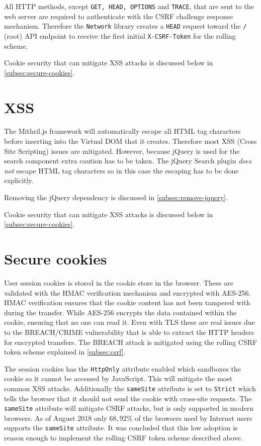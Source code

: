 \documentclass[12pt,a4paper]{report}
\begin{document}
All HTTP methods, except \texttt{GET, HEAD, OPTIONS} and \texttt{TRACE}, that are sent to the web server are required to authenticate with the CSRF challenge response mechanism. Therefore the \texttt{Network} library creates a \texttt{HEAD} request toward the \texttt{/} (root) API endpoint to receive the first initial \texttt{X-CSRF-Token} for the rolling scheme.

Cookie security that can mitigate XSS attacks is discussed below in \autoref{subsec:secure-cookies}.

\section{XSS}
The Mithril.js framework will automatically escape all HTML tag characters before inserting into the Virtual DOM that it creates\cite{mithril-trust}. Therefore most XSS (Cross Site Scripting) issues are mitigated. However, because jQuery is used for the search component extra caution has to be taken. The jQuery Search plugin \textit{does not} escape HTML tag characters so in this case the escaping has to be done explicitly.

Removing the jQuery dependency is discussed in \autoref{subsec:remove-jquery}.

Cookie security that can mitigate XSS attacks is discussed below in \autoref{subsec:secure-cookies}.

\section{Secure cookies}
\label{subsec:secure-cookies}
User session cookies is stored in the cookie store in the browser. These are validated with the HMAC verification mechanism and encrypted with AES-256. HMAC verification ensures that the cookie content has not been tampered with during the transfer\cite{fips-198}. While AES-256 encrypts the data contained within the cookie, ensuring that no one can read it\cite{fips-197}. Even with TLS these are real issues due to the BREACH/CRIME vulnerability that is able to extract the HTTP headers for encrypted transfers\cite{breach}. The BREACH attack is mitigated using the rolling CSRF token scheme explained in \autoref{subsec:csrf}.

The session cookies has the \texttt{HttpOnly} attribute enabled which sandboxes the cookie so it cannot be accessed by JavaScript. This will mitigate the most common XSS attacks\cite{owasp-httponly}. Additionally the \texttt{sameSite} attribute is set to \texttt{Strict} which tells the browser that it should not send the cookie with cross-site requests\cite{owasp-samesite}. The \texttt{sameSite} attribute will mitigate CSRF attacks, but is only supported in modern browsers. As of August 2018 only $68,92 \%$ of the browsers used by Internet users supports the \texttt{sameSite} attribute\cite{owasp-samesite-support}. It was concluded that this low adoption is reason enough to implement the rolling CSRF token scheme described above.
\end{document}
